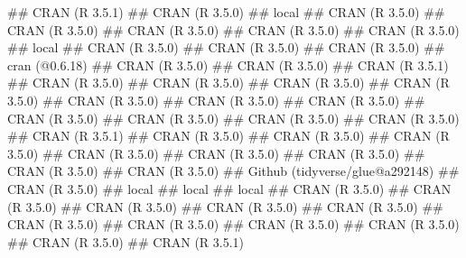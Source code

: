 \documentclass[]{book}
\newenvironment{Shaded}{\begin{snugshade}}{\end{snugshade}}
\newcommand{\NormalTok}[1]{#1}
\theoremstyle{definition}
\theoremstyle{definition}
\theoremstyle{definition}
\theoremstyle{remark}
\begin{document}
\begin{Shaded}
\begin{Highlighting}[]
\NormalTok{##  CRAN (R 3.5.1)                   }
\NormalTok{##  CRAN (R 3.5.0)                   }
\NormalTok{##  local                            }
\NormalTok{##  CRAN (R 3.5.0)                   }
\NormalTok{##  CRAN (R 3.5.0)                   }
\NormalTok{##  CRAN (R 3.5.0)                   }
\NormalTok{##  CRAN (R 3.5.0)                   }
\NormalTok{##  CRAN (R 3.5.0)                   }
\NormalTok{##  local                            }
\NormalTok{##  CRAN (R 3.5.0)                   }
\NormalTok{##  CRAN (R 3.5.0)                   }
\NormalTok{##  CRAN (R 3.5.0)                   }
\NormalTok{##  cran (@0.6.18)                   }
\NormalTok{##  CRAN (R 3.5.0)                   }
\NormalTok{##  CRAN (R 3.5.0)                   }
\NormalTok{##  CRAN (R 3.5.1)                   }
\NormalTok{##  CRAN (R 3.5.0)                   }
\NormalTok{##  CRAN (R 3.5.0)                   }
\NormalTok{##  CRAN (R 3.5.0)                   }
\NormalTok{##  CRAN (R 3.5.0)                   }
\NormalTok{##  CRAN (R 3.5.0)                   }
\NormalTok{##  CRAN (R 3.5.0)                   }
\NormalTok{##  CRAN (R 3.5.0)                   }
\NormalTok{##  CRAN (R 3.5.0)                   }
\NormalTok{##  CRAN (R 3.5.0)                   }
\NormalTok{##  CRAN (R 3.5.0)                   }
\NormalTok{##  CRAN (R 3.5.0)                   }
\NormalTok{##  CRAN (R 3.5.1)                   }
\NormalTok{##  CRAN (R 3.5.0)                   }
\NormalTok{##  CRAN (R 3.5.0)                   }
\NormalTok{##  CRAN (R 3.5.0)                   }
\NormalTok{##  CRAN (R 3.5.0)                   }
\NormalTok{##  CRAN (R 3.5.0)                   }
\NormalTok{##  CRAN (R 3.5.0)                   }
\NormalTok{##  CRAN (R 3.5.0)                   }
\NormalTok{##  CRAN (R 3.5.0)                   }
\NormalTok{##  Github (tidyverse/glue@a292148)  }
\NormalTok{##  CRAN (R 3.5.0)                   }
\NormalTok{##  local                            }
\NormalTok{##  local                            }
\NormalTok{##  local                            }
\NormalTok{##  CRAN (R 3.5.0)                   }
\NormalTok{##  CRAN (R 3.5.0)                   }
\NormalTok{##  CRAN (R 3.5.0)                   }
\NormalTok{##  CRAN (R 3.5.0)                   }
\NormalTok{##  CRAN (R 3.5.0)                   }
\NormalTok{##  CRAN (R 3.5.0)                   }
\NormalTok{##  CRAN (R 3.5.0)                   }
\NormalTok{##  CRAN (R 3.5.0)                   }
\NormalTok{##  CRAN (R 3.5.0)                   }
\NormalTok{##  CRAN (R 3.5.0)                   }
\NormalTok{##  CRAN (R 3.5.1)                   }

\end{Highlighting}
\end{Shaded}
\end{document}
